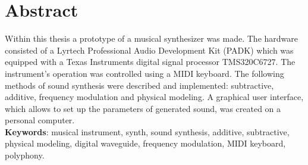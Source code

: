 \chapter*{Abstract}
Within this thesis a prototype of a musical synthesizer was made. The hardware consisted of a Lyrtech Professional Audio Development Kit (PADK) which was equipped with a Texas Instruments digital signal processor TMS320C6727. The instrument's operation was controlled using a MIDI keyboard. The following methods of sound synthesis were described and implemented: subtractive, additive, frequency modulation and physical modeling. A graphical user interface, which allows to set up the parameters of generated sound, was created on a personal computer.
\newline
\\
\textbf{Keywords}: musical instrument, synth, sound synthesis, additive, subtractive, physical modeling, digital waveguide, frequency modulation, MIDI keyboard, polyphony.


